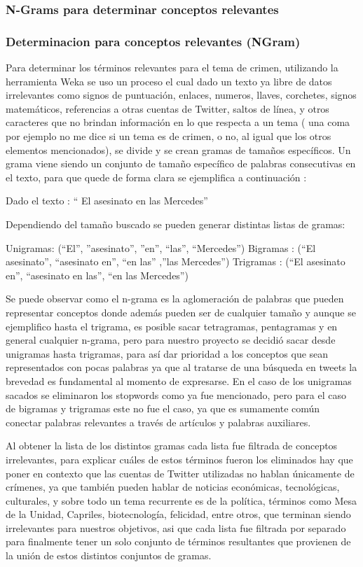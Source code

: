 \documentclass{beamer}
\begin{document}
\subsubsection{N-Grams para determinar conceptos relevantes}
\begin{frame}
\frametitle{Determinacion para conceptos relevantes (NGram)}
Para determinar los términos relevantes para el tema de crimen, utilizando la herramienta Weka se uso un proceso el cual dado un texto ya libre de datos irrelevantes como signos de puntuación, enlaces, numeros, llaves, corchetes, signos matemáticos, referencias a otras cuentas de Twitter, saltos de línea, y otros caracteres que no brindan información en lo que respecta a un  tema ( una coma por ejemplo no me dice si un tema es de crimen, o no, al igual que los otros elementos mencionados),  se divide y se crean gramas de tamaños específicos. Un grama viene siendo un conjunto de tamaño específico de palabras consecutivas en el texto, para que quede de forma clara se ejemplifica a continuación : 


Dado el texto : “ El asesinato en las Mercedes” 


Dependiendo del tamaño buscado se pueden generar distintas listas de gramas:
 
Unigramas: (“El”, ”asesinato”, ”en”, “las”, “Mercedes”) 
Bigramas : (“El asesinato”, “asesinato en”, “en las” ,”las Mercedes”) 
Trigramas : (“El asesinato en”, “asesinato en las”, “en las Mercedes”) 


Se puede observar como el n-grama es la aglomeración de palabras que pueden representar conceptos donde además pueden ser de cualquier tamaño y aunque se ejemplifico hasta el trigrama, es posible sacar tetragramas, pentagramas y en general cualquier n-grama, pero para nuestro proyecto se decidió sacar desde unigramas hasta trigramas, para así dar prioridad a los conceptos que sean representados con pocas palabras ya que al tratarse de una búsqueda en tweets la brevedad es fundamental al momento de expresarse. En el caso de los unigramas sacados se eliminaron los stopwords como ya fue mencionado, pero para el caso de bigramas y trigramas este no fue el caso, ya que es sumamente común conectar palabras relevantes a través de artículos y palabras auxiliares.
 
Al obtener la lista de los distintos gramas cada lista fue filtrada de conceptos irrelevantes, para explicar cuáles de estos términos fueron los eliminados hay que poner en contexto que las cuentas de Twitter utilizadas no hablan únicamente de crímenes, ya que también pueden hablar de noticias económicas, tecnológicas, culturales, y sobre todo un tema recurrente es de la política, términos como Mesa de la Unidad, Capriles, biotecnología, felicidad, entre otros, que terminan siendo irrelevantes para nuestros objetivos, asi que cada lista fue filtrada por separado para finalmente tener un solo conjunto de términos resultantes que provienen de la unión de estos distintos conjuntos de gramas.
 

\end{frame}
\end{document}
